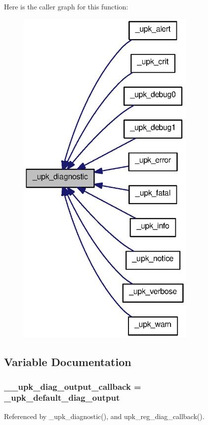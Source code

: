 Here is the caller graph for this function:\nopagebreak
\begin{figure}[H]
\begin{center}
\leavevmode
\includegraphics[width=246pt]{upk__error_8c_ad14e81d375393c4706c348edabd52a99_icgraph}
\end{center}
\end{figure}




\subsection{Variable Documentation}
\subsubsection[{\_\-\_\-upk\_\-diag\_\-output\_\-callback}]{ {\bf \_\-\_\-upk\_\-diag\_\-output\_\-callback} = \_\-upk\_\-default\_\-diag\_\-output}\label{upk__error_8c_aedd920cbf73e5ed62af50ee77ac71c56}


Referenced by \_\-upk\_\-diagnostic(), and upk\_\-reg\_\-diag\_\-callback().

